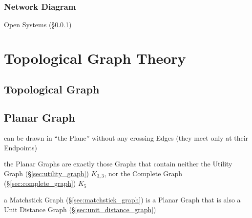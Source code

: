 \subsubsection{Network Diagram}\label{sec:network_diagram}


Open Systems (\S\ref{sec:network_diagram})



\section{Topological Graph Theory}\label{sec:topological_graph_theory}

\subsection{Topological Graph}\label{sec:topological_graph}




\subsection{Planar Graph}\label{sec:planar_graph}

can be drawn in ``the Plane'' without any crossing Edges (they meet only at
their Endpoints)


the Planar Graphs are exactly those Graphs that contain neither the Utility
Graph (\S\ref{sec:utility_graph}) $K_{3,3}$, nor the Complete Graph
(\S\ref{sec:complete_graph}) $K_5$

a Matchstick Graph (\S\ref{sec:matchstick_graph}) is a Planar Graph that
is also a Unit Distance Graph (\S\ref{sec:unit_distance_graph})



